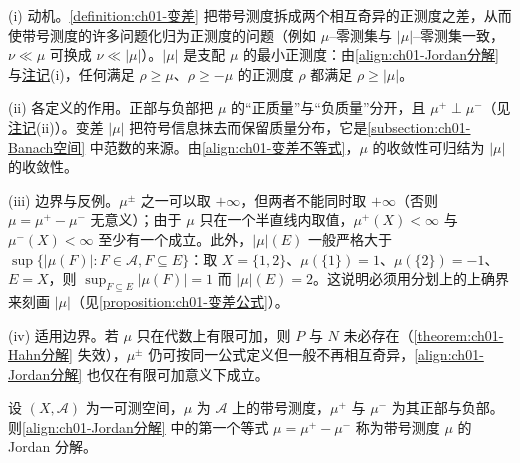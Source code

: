 \documentclass[../../main.tex]{subfiles}%
\begin{document}
\begin{remark}\label{remark:ch01-变差动机}
(i) 动机。\cref{definition:ch01-变差} 把带号测度拆成两个相互奇异的正测度之差，从而使带号测度的许多问题化归为正测度的问题（例如 $\mu$--零测集与 $|\mu|$--零测集一致，$\nu\ll\mu$ 可换成 $\nu\ll|\mu|$）。$|\mu|$ 是支配 $\mu$ 的最小正测度：由\eqref{align:ch01-Jordan分解} 与\hyperref[remark:ch01-Jordan性质]{注记}(i)，任何满足 $\rho\geqslant\mu$、$\rho\geqslant-\mu$ 的正测度 $\rho$ 都满足 $\rho\geqslant|\mu|$。

(ii) 各定义的作用。正部与负部把 $\mu$ 的“正质量”与“负质量”分开，且 $\mu^+\perp\mu^-$（见\hyperref[remark:ch01-奇异绝对连续注记]{注记}(ii)）。变差 $|\mu|$ 把符号信息抹去而保留质量分布，它是\cref{subsection:ch01-Banach空间} 中范数的来源。由\eqref{align:ch01-变差不等式}，$\mu$ 的收敛性可归结为 $|\mu|$ 的收敛性。

(iii) 边界与反例。$\mu^\pm$ 之一可以取 $+\infty$，但两者不能同时取 $+\infty$（否则 $\mu=\mu^+-\mu^-$ 无意义）；由于 $\mu$ 只在一个半直线内取值，$\mu^+(X)<\infty$ 与 $\mu^-(X)<\infty$ 至少有一个成立。此外，$|\mu|(E)$ 一般严格大于 $\sup\{|\mu(F)|:F\in\mathcal{A},F\subseteq E\}$：取 $X=\{1,2\}$、$\mu(\{1\})=1$、$\mu(\{2\})=-1$、$E=X$，则 $\sup_{F\subseteq E}|\mu(F)|=1$ 而 $|\mu|(E)=2$。这说明必须用分划上的上确界来刻画 $|\mu|$（见\cref{proposition:ch01-变差公式}）。

(iv) 适用边界。若 $\mu$ 只在代数上有限可加，则 $P$ 与 $N$ 未必存在（\cref{theorem:ch01-Hahn分解} 失效），$\mu^\pm$ 仍可按同一公式定义但一般不再相互奇异，\eqref{align:ch01-Jordan分解} 也仅在有限可加意义下成立。
\end{remark}

\begin{definition}\label{definition:ch01-Jordan分解}
设 $(X,\mathcal{A})$ 为一可测空间，$\mu$ 为 $\mathcal{A}$ 上的带号测度，$\mu^+$ 与 $\mu^-$ 为其正部与负部。则\eqref{align:ch01-Jordan分解} 中的第一个等式 $\mu=\mu^+-\mu^-$ 称为带号测度 $\mu$ 的 Jordan 分解。
\end{definition}
\end{document}
